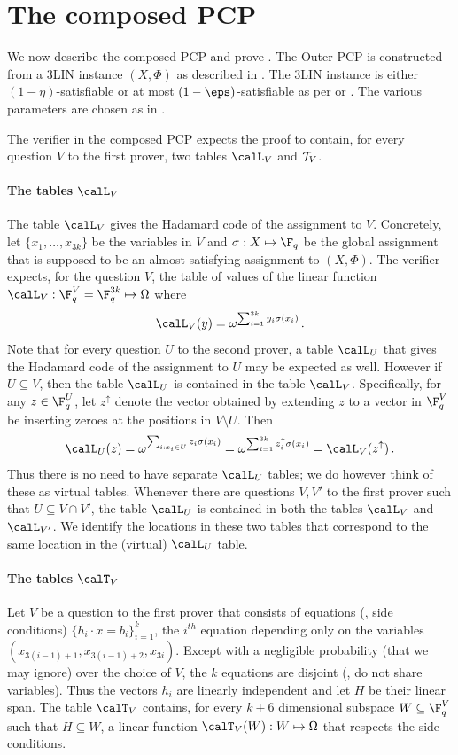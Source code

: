 \section{The composed PCP}\label{sec:composed}
We now describe the composed PCP and prove .
The Outer PCP is constructed from a 3LIN instance $(X, \Phi)$
as described in . The 3LIN instance is either $(1-\eta)$-satisfiable
or at most $(1-\eps)$-satisfiable as per  or .
The various parameters are chosen as in .


The verifier in the composed PCP expects the proof
to contain, for every question $V$ to the first prover, two tables $\calL_V$
and ${\cal T}_V$.

\paragraph{The tables $\calL_V$}
The table $\calL_V$ gives
the Hadamard code of the
assignment to $V$. Concretely, let $\{x_1,\ldots,x_{3k}\}$ be the variables in $V$
and $\sigma : X \mapsto \F_q$ be the global assignment that is supposed to be an
almost satisfying assignment to $(X,\Phi)$. The verifier expects, for the question $V$,
the table of values of the linear function $\calL_V: \F_q^V = \F_q^{3k}
\mapsto \Omega$ where
 $$ \calL_V(y) = \omega^{\sum_{i=1}^{3k} y_i \sigma(x_i)}\,. $$
Note that for every question $U$ to the second prover, a table $\calL_U$ that gives the
Hadamard code
of the assignment to $U$ may be expected as well. However if $U \subseteq V$, then the table $\calL_U$
is contained in the table $\calL_V$. Specifically, for any $z \in \F_q^U$,
let $z^{\uparrow}$ denote the vector obtained by extending $z$
to a vector in $\F_q^V$ be inserting
zeroes at the positions in $V\setminus U$. Then
 $$ \calL_U (z) = \omega^{\sum_{i: x_i \in U} z_i \sigma(x_i)} = \omega^{\sum_{i=1}^{3k}
    z^{\uparrow}_i \sigma(x_i)}
  = \calL_V (z^{\uparrow})\,. $$
Thus there is no need to have separate $\calL_U$ tables; we do however
think of these as virtual tables. Whenever
there are questions $V, V'$ to the first prover such that $U \subseteq V \cap V'$,
the table $\calL_U$ is contained in both the tables $\calL_V$ and $\calL_{V'}$.
We identify the
locations in these two tables that correspond to the same location in the
(virtual) $\calL_U$ table.

\paragraph{The tables $\calT_V$}
Let $V$ be a question to the first prover that consists of equations (\ie,
side conditions)
$\{h_i\cdot x = b_i\}_{i=1}^k$, the $i^{th}$ equation depending only on the
variables $(x_{3(i-1)+1}, x_{3(i-1)+2}, x_{3i})$. Except with a negligible
probability (that we may ignore) over
the choice of $V$, the $k$ equations are disjoint (\ie, do not share variables).
Thus the vectors $h_i$ are
linearly independent and let $H$ be their linear span.
The table $\calT_V$ contains, for every $k+6$ dimensional subspace $W \subseteq
\F_q^V$ such that $H\subseteq W$, a linear function $\calT_V(W) : W \mapsto \Omega$
that respects the side conditions.

